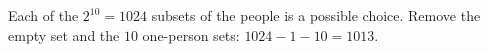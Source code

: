 Each of the $2^{10}=1024$ subsets of the people is a possible choice. Remove the empty set and the $10$ one-person sets: $1024-1-10=\boxed{1013}$.
